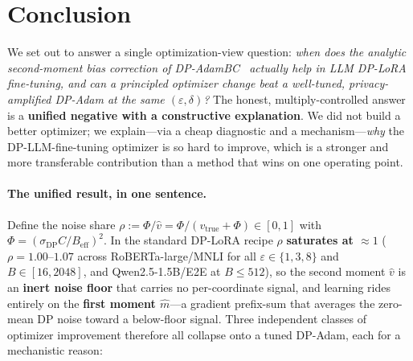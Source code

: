 \documentclass[11pt]{article}
\theoremstyle{plain}
\theoremstyle{definition}
\theoremstyle{remark}
\begin{document}
\section{Conclusion}
\label{sec:conclusion}

We set out to answer a single optimization-view question: \emph{when does the analytic
second-moment bias correction of DP-AdamBC~\citep{tang2024dpadambc} actually help in LLM
DP-LoRA fine-tuning, and can a principled optimizer change beat a well-tuned,
privacy-amplified DP-Adam at the same $(\varepsilon,\delta)$?} The honest, multiply-controlled
answer is a \textbf{unified negative with a constructive explanation}. We did not build a
better optimizer; we explain---via a cheap diagnostic and a mechanism---\emph{why} the
DP-LLM-fine-tuning optimizer is so hard to improve, which is a stronger and more transferable
contribution than a method that wins on one operating point.

\paragraph{The unified result, in one sentence.}
Define the noise share $\rho := \Phi/\hat v = \Phi/(v_{\mathrm{true}}+\Phi)\in[0,1]$ with
$\Phi=(\sigma_{\mathrm{DP}}C/B_{\mathrm{eff}})^2$. In the standard DP-LoRA recipe
$\rho$ \textbf{saturates at $\approx 1$} ($\rho=1.00$--$1.07$ across RoBERTa-large/MNLI for all
$\varepsilon\in\{1,3,8\}$ and $B\in[16,2048]$, and Qwen2.5-1.5B/E2E at $B\le512$), so the
second moment $\hat v$ is an \textbf{inert noise floor} that carries no per-coordinate signal,
and learning rides entirely on the \textbf{first moment $\hat m$}---a gradient prefix-sum that
averages the zero-mean DP noise toward a below-floor signal. Three independent classes of
optimizer improvement therefore all collapse onto a tuned DP-Adam, each for a mechanistic
reason:
\end{document}
